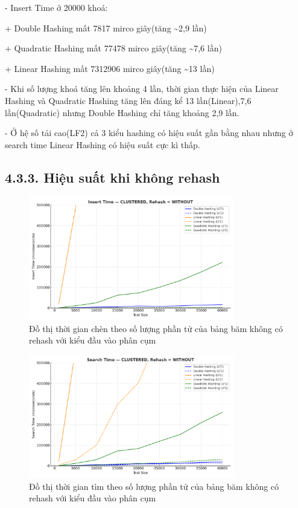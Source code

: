 \documentclass[12pt,a4paper]{report}
\begin{document}
-	Insert Time ở 20000 khoá:

\hspace{1cm}+ Double Hashing mất 7817 mirco giây(tăng \textasciitilde 2,9 lần)

\hspace{1cm}+ Quadratic Hashing mất 77478 mirco giây(tăng \textasciitilde 7,6 lần)

\hspace{1cm}+ Linear Hashing mất 7312906 mirco giây(tăng \textasciitilde 13 lần)

-	Khi số lượng khoá tăng lên khoảng 4 lần, thời gian thực hiện của Linear Hashing và Quadratic Hashing tăng lên đáng kể 13 lần(Linear),7,6 lần(Quadratic) nhưng Double Hashing chỉ tăng khoảng 2,9 lần.

-	Ở hệ số tải cao(LF2) cả 3 kiểu hashing có hiệu suất gần bằng nhau nhưng ở search time Linear Hashing có hiệu suất cực kì thấp.

\subsection*{4.3.3. Hiệu suất khi không rehash}

\begin{figure}[!ht]
    \centering
    \includegraphics[width=0.8\textwidth]{clus_clus_not.png}
    \caption{Đồ thị thời gian chèn theo số lượng phần tử của bảng băm không có rehash với kiểu đầu vào phân cụm}
    \label{fig:flowchart}
\end{figure}

\begin{figure}[!ht]
    \centering
    \includegraphics[width=0.8\textwidth]{clus_ser_not.png}
    \caption{Đồ thị thời gian tìm theo số lượng phần tử của bảng băm không có rehash với kiểu đầu vào phân cụm}
    \label{fig:flowchart}
\end{figure}
\end{document}
